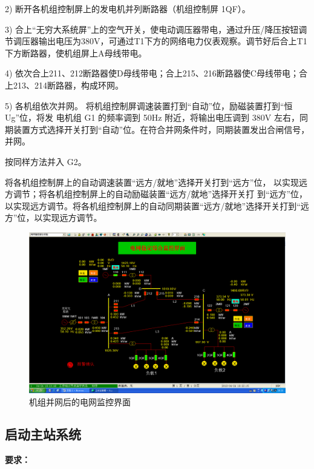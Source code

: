 \documentclass[a4paper]{ctexrep}
\begin{document}
                    2) 断开各机组控制屏上的发电机并列断路器（机组控制屏 1QF）。
                    
                    3) 合上“无穷大系统屏”上的空气开关，使电动调压器带电，通过升压/降压按钮调节调压器输出电压为380V，可通过T1下方的网络电力仪表观察。调节好后合上T1下方断路器，使机组屏上A母线带电。
                    
                    4) 依次合上211、212断路器使D母线带电；合上215、216断路器使C母线带电；合上213、214断路器，构成环网。
                    
                    
                    
                    5) 各机组依次并网。
                    将机组控制屏调速装置打到“自动”位，励磁装置打到“恒 Ug”位，将发  
                    电机组 G1 的频率调到 50Hz 附近，将输出电压调到 380V 左右，同期装置方式选择开关打到“自动”位。在符合并网条件时，同期装置发出合闸信号，并网。
                    
                    按同样方法并入 G2。
                    
                    将各机组控制屏上的自动调速装置“远方/就地”选择开关打到“远方”位，
                    以实现远方调节；将各机组控制屏上的自动励磁装置“远方/就地”选择开关打
                    到“远方”位，以实现远方调节。将各机组控制屏上的自动同期装置“远方/就地”选择开关打到“远方”位，以实现远方调节。

                    \begin{figure}[htbp]
                        \centering
                        \includegraphics[width=12cm]{15.png}
                        \caption{机组并网后的电网监控界面}
                    \end{figure}

                \subsection{启动主站系统}
                    \textbf{要求：}
\end{document}
